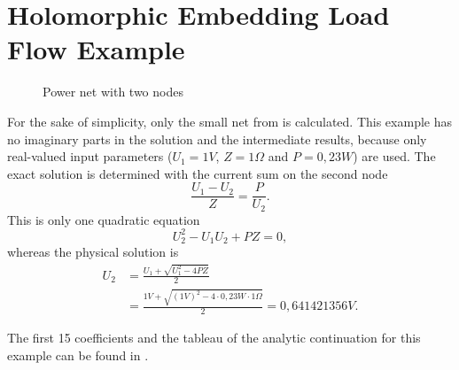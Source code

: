 \chapter{Holomorphic Embedding Load Flow Example}
\label{chap:helm_example}

\begin{figure}
	\centering
	
	\caption{Power net with two nodes}
	\label{fig:two_node_net}
\end{figure}

For the sake of simplicity, only the small net from  is calculated. This example has no imaginary parts in the solution and the intermediate results, because only real-valued input parameters ($U_1 = \si{1}{V}$, $Z = \si{1}{\Omega}$ and $P = \si{0,23}{W}$) are used. The exact solution is determined with the current sum on the second node
\begin{equation}
	\frac{U_1 - U_2}{Z} = \frac{P}{U_2}.
\end{equation}
This is only one quadratic equation
\begin{equation}
	U_2^2 - U_1 U_2 + P Z = 0,
\end{equation}
whereas the physical solution is
\begin{align}
	U_2 & = \frac{U_1 + \sqrt{U_1^2 - 4 P Z}}{2} \\
		& = \frac{\si{1}{V} + \sqrt{(\si{1}{V})^2 - 4 \cdot \si{0,23}{W} \cdot \si{1}{\Omega}}}{2} = \si{0,641421356}{V}.
\end{align}

The first 15 coefficients and the tableau of the analytic continuation for this example can be found in .


